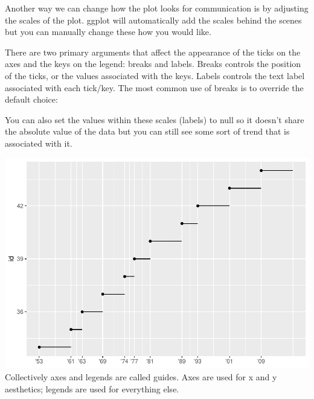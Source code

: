 \documentclass[
]{article}
\newenvironment{Shaded}{\begin{snugshade}}{\end{snugshade}}
\newcommand{\AttributeTok}[1]{\textcolor[rgb]{0.77,0.63,0.00}{#1}}
\newcommand{\ConstantTok}[1]{\textcolor[rgb]{0.00,0.00,0.00}{#1}}
\newcommand{\DecValTok}[1]{\textcolor[rgb]{0.00,0.00,0.81}{#1}}
\newcommand{\FunctionTok}[1]{\textcolor[rgb]{0.00,0.00,0.00}{#1}}
\newcommand{\NormalTok}[1]{#1}
\newcommand{\SpecialCharTok}[1]{\textcolor[rgb]{0.00,0.00,0.00}{#1}}
\newcommand{\StringTok}[1]{\textcolor[rgb]{0.31,0.60,0.02}{#1}}
\begin{document}
Another way we can change how the plot looks for communication is by
adjusting the scales of the plot. ggplot will automatically add the
scales behind the scenes but you can manually change these how you would
like.

There are two primary arguments that affect the appearance of the ticks
on the axes and the keys on the legend: breaks and labels. Breaks
controls the position of the ticks, or the values associated with the
keys. Labels controls the text label associated with each tick/key. The
most common use of breaks is to override the default choice:

You can also set the values within these scales (labels) to null so it
doesn't share the absolute value of the data but you can still see some
sort of trend that is associated with it.

\begin{Shaded}
\end{Shaded}

\includegraphics{Journal_files/figure-latex/unnamed-chunk-55-1.pdf}
Collectively axes and legends are called guides. Axes are used for x and
y aesthetics; legends are used for everything else.
\end{document}
